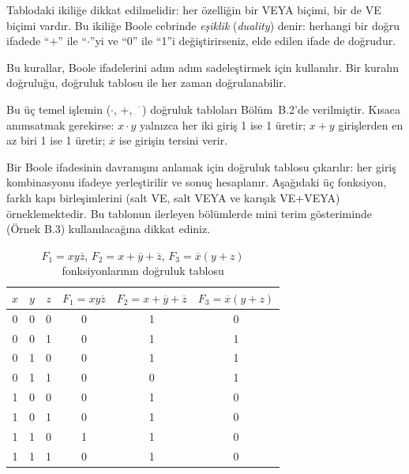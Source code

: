 Tablodaki ikiliğe dikkat edilmelidir: her özelliğin bir VEYA biçimi, bir de VE biçimi vardır. Bu ikiliğe Boole cebrinde \emph{eşiklik} (\emph{duality}) denir: herhangi bir doğru ifadede ``$+$'' ile ``$\cdot$''yi ve ``0'' ile ``1''i değiştirirseniz, elde edilen ifade de doğrudur.

Bu kurallar, Boole ifadelerini adım adım sadeleştirmek için kullanılır. Bir kuralın doğruluğu, doğruluk tablosu ile her zaman doğrulanabilir.

Bu üç temel işlemin ($\cdot$, $+$, $\overline{\phantom{x}}$) doğruluk tabloları Bölüm~B.2'de verilmiştir. Kısaca anımsatmak gerekirse: $x \cdot y$ yalnızca her iki giriş 1 ise 1 üretir; $x + y$ girişlerden en az biri 1 ise 1 üretir; $\overline{x}$ ise girişin tersini verir.

Bir Boole ifadesinin davranışını anlamak için doğruluk tablosu çıkarılır: her giriş kombinasyonu ifadeye yerleştirilir ve sonuç hesaplanır. Aşağıdaki üç fonksiyon, farklı kapı birleşimlerini (salt VE, salt VEYA ve karışık VE+VEYA) örneklemektedir. Bu tablonun ilerleyen bölümlerde mini terim gösteriminde (Örnek B.3) kullanılacağına dikkat ediniz.

\begin{table}[H]
\centering
\caption{$F_1 = x y \overline{z}$, $F_2 = x + \overline{y} + \overline{z}$, $F_3 = \overline{x}(y + z)$ fonksiyonlarının doğruluk tablosu}
\label{tab:B.3}
\begin{tabular}{ccc|ccc}
\toprule
$x$ & $y$ & $z$ & $F_1 = x y \overline{z}$ & $F_2 = x + \overline{y} + \overline{z}$ & $F_3 = \overline{x}(y + z)$ \\
\midrule
0 & 0 & 0 & 0 & 1 & 0 \\
0 & 0 & 1 & 0 & 1 & 1 \\
0 & 1 & 0 & 0 & 1 & 1 \\
0 & 1 & 1 & 0 & 0 & 1 \\
1 & 0 & 0 & 0 & 1 & 0 \\
1 & 0 & 1 & 0 & 1 & 0 \\
1 & 1 & 0 & 1 & 1 & 0 \\
1 & 1 & 1 & 0 & 1 & 0 \\
\bottomrule
\end{tabular}
\end{table}

